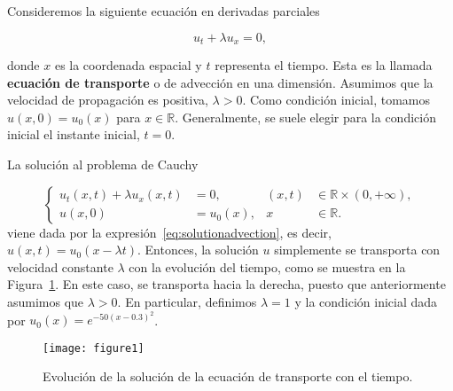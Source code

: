 \begin{example}
  Consideremos la siguiente ecuación en derivadas parciales

  \begin{equation*}
    u_{t}+
    \lambda u_{x}=
    0,
  \end{equation*}

  donde $x$ es la coordenada espacial y $t$ representa el tiempo.
  Esta es la llamada \textbf{ecuación de transporte} o de advección
  en una dimensión.
  Asumimos que la velocidad de propagación es positiva, $\lambda>0$.
  Como condición inicial, tomamos
  \begin{math}
    u\left(x,0\right)=
    u_{0}\left(x\right)
  \end{math}
  para $x\in\mathbb{R}$.
  Generalmente, se suele elegir para la condición inicial el instante
  inicial, $t=0$.

  La solución al problema de Cauchy

  \begin{equation*}
    \left\{
    \begin{aligned}
      u_{t}
      \left(x,t\right)+
      \lambda
      u_{x}
      \left(x,t\right)
                           & =
      0,                   &
      \left(x,t\right)     & \in
      \mathbb{R}\times
      \left(0,+\infty\right),               \\
      u\left(x,0\right)    & =
      u_{0}\left(x\right), &
      x                    & \in\mathbb{R}.
    \end{aligned}
    \right.
  \end{equation*}
  viene dada por la expresión~\eqref{eq:solutionadvection}, es decir,
  $u\left(x,t\right)=u_{0}\left(x-\lambda t\right)$.
  Entonces, la solución $u$ simplemente se transporta con velocidad
  constante $\lambda$ con la evolución del tiempo, como se muestra en
  la Figura~\ref{fig:1}.
  En este caso, se transporta hacia la derecha, puesto que
  anteriormente asumimos que $\lambda>0$.
  En particular, definimos $\lambda=1$ y la condición inicial dada
  por
  \begin{math}
    u_{0}
    \left(x\right)=
    e^{-50{\left(x-0.3\right)}^{2}}
  \end{math}.
\end{example}

\begin{figure}[ht!]
  \centering
  \texttt{[image: figure1]}
  \caption{
    Evolución de la solución de la ecuación de transporte con el
    tiempo.
  }
  \label{fig:1}
\end{figure}

